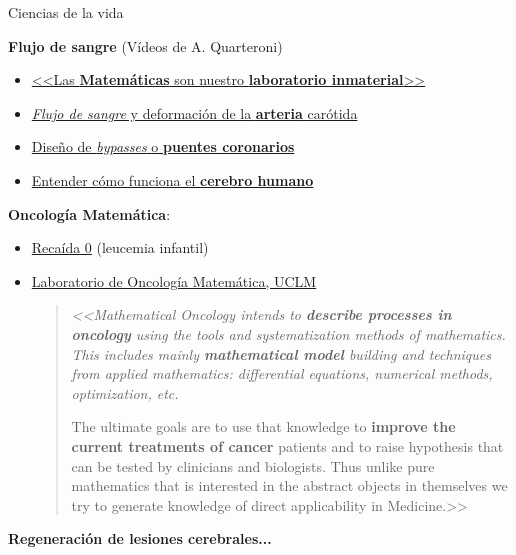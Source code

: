 \documentclass[
  unknownkeysallowed %
]{beamer}
\begin{document}
\begin{frame}{Ciencias de la vida}
  \small

  {\normalsize\bf Flujo de sangre} (Vídeos de A. Quarteroni)
  \begin{itemize}
  \item \href{https://youtu.be/8W4oFOymiyM?t=511}{<<Las
      \textbf{Matemáticas} son nuestro \textbf{laboratorio
        inmaterial}>>}
  \item \href{https://youtu.be/8W4oFOymiyM?t=645}{\textit{Flujo de sangre} y deformación de la \textbf{arteria} carótida}
  \item \href{https://youtu.be/8W4oFOymiyM?t=787}{Diseño de \textit{bypasses} o \textbf{puentes coronarios}}
  \item \href{https://youtu.be/8W4oFOymiyM?t=823}{Entender cómo funciona el \textbf{cerebro humano}}
  \end{itemize}
  \smallskip
  {\normalsize\bf Oncología Matemática}:
  \begin{itemize}
  \item \href{https://es-es.facebook.com/recaida0/}{Recaída 0} (leucemia infantil)
  \item
    \href{http://matematicas.uclm.es/imaci/molab/mathoncol}{Laboratorio
      de Oncología Matemática, UCLM}
    \begin{quotation}\scriptsize\em
      <<Mathematical Oncology intends to \textbf{describe processes in oncology}
      using the tools and systematization methods of mathematics. This
      includes mainly \textbf{mathematical model} building and techniques from
      applied mathematics: differential equations, numerical methods,
      optimization, etc.

      The ultimate goals are to use that knowledge to \textbf{improve the
      current treatments of cancer} patients and to raise hypothesis
      that can be tested by clinicians and biologists. Thus unlike
      pure mathematics that is interested in the abstract objects in
      themselves we try to generate knowledge of direct applicability
      in Medicine.>>
    \end{quotation}
  \end{itemize}
  \smallskip
  {\large\bf Regeneración de \alert{lesiones cerebrales}...}
\end{frame}

\end{document}
